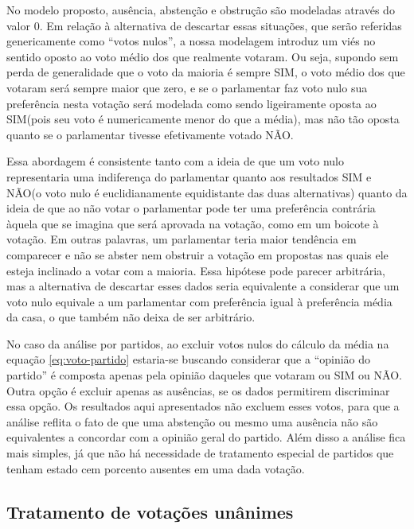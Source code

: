 \documentclass[
	article,			%
	12pt,				%
	oneside,			%
	a4paper,			%
	english,			%
	brazil,				%
	sumario=tradicional,
	oldfontcommands %
	]{abntex2}
\newcommand\nay{NÃO\xspace}
\newcommand\yea{SIM\xspace}
\begin{document}
No modelo proposto, ausência, abstenção e obstrução são modeladas através do valor 0. Em relação à alternativa de descartar essas situações, que serão referidas genericamente como ``votos nulos'', a nossa modelagem introduz um viés no sentido oposto ao voto médio dos que realmente votaram. Ou seja, supondo sem perda de generalidade que o voto da maioria é sempre \yea, o voto médio dos que votaram será sempre maior que zero, e se o parlamentar faz voto nulo sua preferência nesta votação será modelada como sendo ligeiramente oposta ao \yea (pois seu voto é numericamente menor do que a média), mas não tão oposta quanto se o parlamentar tivesse efetivamente votado \nay.

Essa abordagem é consistente tanto com a ideia de que um voto nulo representaria uma indiferença do parlamentar quanto aos resultados \yea e \nay (o voto nulo é euclidianamente equidistante das duas alternativas) quanto da ideia de que ao não votar o parlamentar pode ter uma preferência contrária àquela que se imagina que será aprovada na votação, como em um boicote à votação. Em outras palavras, um parlamentar teria maior tendência em comparecer e não se abster nem obstruir a votação em propostas nas quais ele esteja inclinado a votar com a maioria. Essa hipótese pode parecer arbitrária, mas a alternativa de descartar esses dados seria equivalente a considerar que um voto nulo equivale a um parlamentar com preferência igual à preferência média da casa, o que também não deixa de ser arbitrário.


No caso da análise por partidos, ao excluir votos nulos do cálculo da média na equação \ref{eq:voto-partido} estaria-se buscando considerar que a ``opinião do partido'' é composta apenas pela opinião daqueles que votaram ou \yea ou \nay. Outra opção é excluir apenas as ausências, se os dados permitirem discriminar essa opção. Os resultados aqui apresentados não excluem esses votos, para que a análise reflita o fato de que uma abstenção ou mesmo uma ausência não são equivalentes a concordar com a opinião geral do partido. Além disso a análise fica mais simples, já que não há necessidade de tratamento especial de partidos que tenham estado cem porcento ausentes em uma dada votação.

\subsection{Tratamento de votações unânimes}
\end{document}
